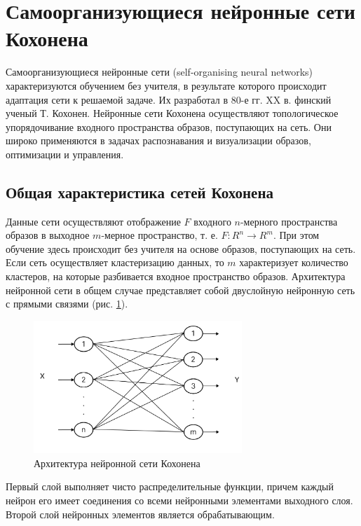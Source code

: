 \documentclass[bachelor, och, referat]{template}
\begin{document}
\section{Самоорганизующиеся нейронные сети Кохонена}

Самоорганизующиеся нейронные сети (self-organising neural networks)
характеризуются обучением без учителя, в результате которого происходит 
адаптация сети к решаемой задаче. Их разработал в 80-е гг. XX в.
финский ученый Т. Кохонен. Нейронные сети
Кохонена осуществляют топологическое упорядочивание входного
пространства образов, поступающих на сеть. Они широко применяются
в задачах распознавания и визуализации образов, оптимизации и
управления.

\subsection{Общая характеристика сетей Кохонена}

Данные сети осуществляют отображение $F$ входного $n$-мерного пространства 
образов в выходное $m$-мерное пространство, т. е. $F : R^n \rightarrow R^m$.
При этом обучение здесь происходит без учителя на основе образов,
поступающих на сеть. Если сеть осуществляет кластеризацию данных,
то $m$ характеризует количество кластеров, на которые разбивается входное 
пространство образов. Архитектура нейронной сети в общем случае
представляет собой двуслойную нейронную сеть с прямыми связями (рис. \ref{nn1}).

\begin{figure}[H]
    \centering
    \includegraphics[width=0.7\textwidth]{pics/nn1.png}
    \caption{Архитектура нейронной сети Кохонена}
    \label{nn1}
\end{figure}

Первый слой выполняет чисто распределительные функции, причем 
каждый нейрон его имеет соединения со всеми нейронными элементами 
выходного слоя. Второй слой нейронных элементов является
обрабатывающим.
\end{document}
